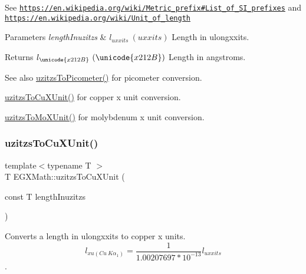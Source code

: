 See \href{https://en.wikipedia.org/wiki/Metric_prefix#List_of_SI_prefixes}{\tt https\+://en.\+wikipedia.\+org/wiki/\+Metric\+\_\+prefix\#\+List\+\_\+of\+\_\+\+S\+I\+\_\+prefixes} and \href{https://en.wikipedia.org/wiki/Unit_of_length}{\tt https\+://en.\+wikipedia.\+org/wiki/\+Unit\+\_\+of\+\_\+length} 
\begin{DoxyParams}{Parameters}
{\em length\+Inuzitzs} & $ l_{uxxits}\ (uxxits)$ Length in ulongxxits. \\
\hline
\end{DoxyParams}
\begin{DoxyReturn}{Returns}
$ l_{\unicode{x212B}}\ (\unicode{x212B})$ Length in angstroms. 
\end{DoxyReturn}
\begin{DoxySeeAlso}{See also}
\mbox{\hyperlink{group___e_g_x_math-_conversions-_length_conversions-uzitzs-_s_i_ga48c60a4876ac426d1717096263648a4d}{uzitzs\+To\+Picometer()}} for picometer conversion. 

\mbox{\hyperlink{group___e_g_x_math-_conversions-_length_conversions-uzitzs-_non-_s_i_gab25470e41b88c41d4bf32622baa6c472}{uzitzs\+To\+Cu\+X\+Unit()}} for copper x unit conversion. 

\mbox{\hyperlink{group___e_g_x_math-_conversions-_length_conversions-uzitzs-_non-_s_i_ga64b556911b0bb06cf315aa02f5e2d379}{uzitzs\+To\+Mo\+X\+Unit()}} for molybdenum x unit conversion. 
\end{DoxySeeAlso}
\mbox{\label{group___e_g_x_math-_conversions-_length_conversions-uzitzs-_non-_s_i_gab25470e41b88c41d4bf32622baa6c472}} 
\subsubsection{\texorpdfstring{uzitzs\+To\+Cu\+X\+Unit()}{uzitzsToCuXUnit()}}
{\footnotesize\ttfamily template$<$typename T $>$ \\
T E\+G\+X\+Math\+::uzitzs\+To\+Cu\+X\+Unit (\begin{DoxyParamCaption}\item[{const T}]{length\+Inuzitzs }\end{DoxyParamCaption})}



Converts a length in ulongxxits to copper x units. \[ l_{xu(Cu\ K\alpha_1)}= \frac{1}{1.00207697*10^{-13}} l_{uxxits} \]. 


